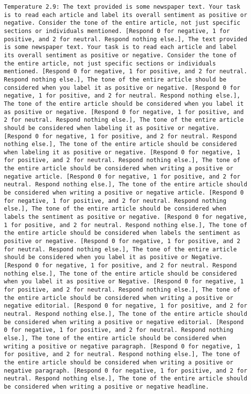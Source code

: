 \begin{lstlisting}[label=lst:poor_performing_prompts]
	Temperature 2.9: The text provided is some newspaper text. Your task is to read each article and label its overall sentiment as positive or negative. Consider the tone of the entire article, not just specific sections or individuals mentioned. [Respond 0 for negative, 1 for positive, and 2 for neutral. Respond nothing else.], The text provided is some newspaper text. Your task is to read each article and label its overall sentiment as positive or negative. Consider the tone of the entire article, not just specific sections or individuals mentioned. [Respond 0 for negative, 1 for positive, and 2 for neutral. Respond nothing else.], The tone of the entire article should be considered when you label it as positive or negative. [Respond 0 for negative, 1 for positive, and 2 for neutral. Respond nothing else.], The tone of the entire article should be considered when you label it as positive or negative. [Respond 0 for negative, 1 for positive, and 2 for neutral. Respond nothing else.], The tone of the entire article should be considered when labeling it as positive or negative. [Respond 0 for negative, 1 for positive, and 2 for neutral. Respond nothing else.], The tone of the entire article should be considered when labeling it as positive or negative. [Respond 0 for negative, 1 for positive, and 2 for neutral. Respond nothing else.], The tone of the entire article should be considered when writing a positive or negative article. [Respond 0 for negative, 1 for positive, and 2 for neutral. Respond nothing else.], The tone of the entire article should be considered when writing a positive or negative article. [Respond 0 for negative, 1 for positive, and 2 for neutral. Respond nothing else.], The tone of the entire article should be considered when labels the sentiment as positive or negative. [Respond 0 for negative, 1 for positive, and 2 for neutral. Respond nothing else.], The tone of the entire article should be considered when labels the sentiment as positive or negative. [Respond 0 for negative, 1 for positive, and 2 for neutral. Respond nothing else.], The tone of the entire article should be considered when you label it as positive or Negative. [Respond 0 for negative, 1 for positive, and 2 for neutral. Respond nothing else.], The tone of the entire article should be considered when you label it as positive or Negative. [Respond 0 for negative, 1 for positive, and 2 for neutral. Respond nothing else.], The tone of the entire article should be considered when writing a positive or negative editorial. [Respond 0 for negative, 1 for positive, and 2 for neutral. Respond nothing else.], The tone of the entire article should be considered when writing a positive or negative editorial. [Respond 0 for negative, 1 for positive, and 2 for neutral. Respond nothing else.], The tone of the entire article should be considered when writing a positive or negative paragraph. [Respond 0 for negative, 1 for positive, and 2 for neutral. Respond nothing else.], The tone of the entire article should be considered when writing a positive or negative paragraph. [Respond 0 for negative, 1 for positive, and 2 for neutral. Respond nothing else.], The tone of the entire article should be considered when writing a positive or negative headline. 
\end{lstlisting}
